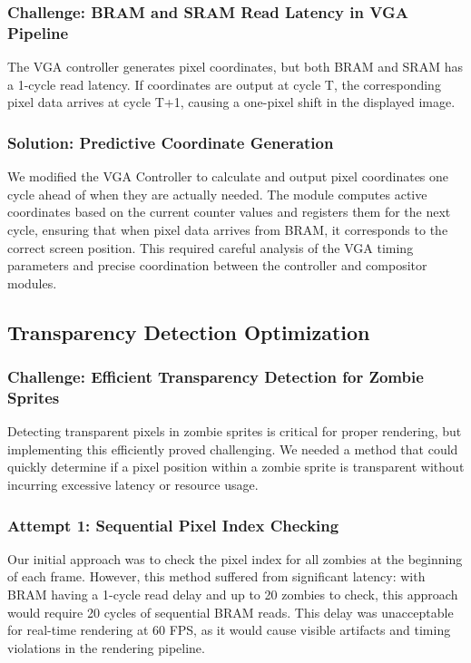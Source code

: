 \documentclass[12pt,a4paper]{article}
\begin{document}
\subsubsection{Challenge: BRAM and SRAM Read Latency in VGA Pipeline}
The VGA controller generates pixel coordinates, but both BRAM and SRAM has a 1-cycle read latency. If coordinates are output at cycle T, the corresponding pixel data arrives at cycle T+1, causing a one-pixel shift in the displayed image.

\subsubsection{Solution: Predictive Coordinate Generation}
We modified the VGA Controller to calculate and output pixel coordinates one cycle ahead of when they are actually needed. The module computes active coordinates based on the current counter values and registers them for the next cycle, ensuring that when pixel data arrives from BRAM, it corresponds to the correct screen position. This required careful analysis of the VGA timing parameters and precise coordination between the controller and compositor modules.

\subsection{Transparency Detection Optimization}

\subsubsection{Challenge: Efficient Transparency Detection for Zombie Sprites}
Detecting transparent pixels in zombie sprites is critical for proper rendering, but implementing this efficiently proved challenging. We needed a method that could quickly determine if a pixel position within a zombie sprite is transparent without incurring excessive latency or resource usage.

\subsubsection{Attempt 1: Sequential Pixel Index Checking}
Our initial approach was to check the pixel index for all zombies at the beginning of each frame. However, this method suffered from significant latency: with BRAM having a 1-cycle read delay and up to 20 zombies to check, this approach would require 20 cycles of sequential BRAM reads. This delay was unacceptable for real-time rendering at 60 FPS, as it would cause visible artifacts and timing violations in the rendering pipeline.
\end{document}
